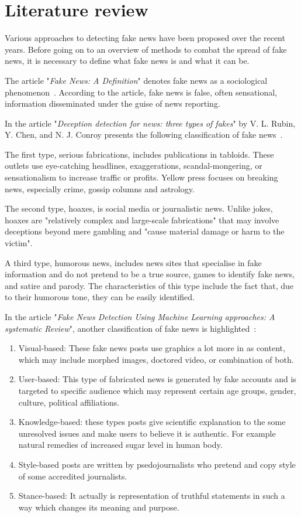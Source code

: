 \newpage
\section{Literature review}\label{sec:lit_rev}

Various approaches to detecting fake news have been proposed over the recent years.
Before going on to an overview of methods to combat the spread of fake news, it is necessary to define what fake news is and what it can be.

The article "\textit{Fake News: A Definition}" denotes fake news as a sociological phenomenon~\cite{0}.
According to the article, fake news is false, often sensational, information disseminated under the guise of news reporting.

In the article "\textit{Deception detection for news: three types of fakes}" by V. L. Rubin, Y. Chen, and N. J. Conroy presents the following classification of fake news~\cite{1}.

The first type, serious fabrications, includes publications in tabloids.
These outlets use eye-catching headlines, exaggerations, scandal-mongering, or sensationalism to increase traffic or profits.
Yellow press focuses on breaking news, especially crime, gossip columns and astrology.

The second type, hoaxes, is social media or journalistic news.
Unlike jokes, hoaxes are "relatively complex and large-scale fabrications" that may involve deceptions beyond mere gambling and "cause material damage or harm to the victim".

A third type, humorous news, includes news sites that specialise in fake information and do not pretend to be a true source, games to identify fake news, and satire and parody.
The characteristics of this type include the fact that, due to their humorous tone, they can be easily identified.

In the article "\textit{Fake News Detection Using Machine Learning approaches: A systematic Review}", another classification of fake news is highlighted~\cite{2}:

\begin{enumerate}
    \item Visual-based: These fake news posts use graphics a lot more in as content, which may include morphed images, doctored video, or combination of both.
    \item User-based: This type of fabricated news is generated by fake accounts and is targeted to specific audience which may represent certain age groups, gender, culture, political affiliations.
    \item Knowledge-based: these types posts give scientific explanation to the some unresolved issues and make users to believe it is authentic.
    For example natural remedies of increased sugar level in human body.
    \item Style-based posts are written by psedojournalists who pretend and copy style of some accredited journalists.
    \item Stance-based: It actually is representation of truthful statements in such a way which changes its meaning and purpose.
\end{enumerate}

